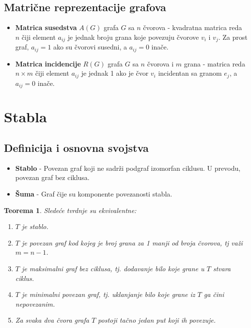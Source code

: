 \documentclass[a4paper,12pt,twoside]{report}
\newtheorem{theorem}{Teorema}[section]
\numberwithin{algorithm}{section}
\begin{document}
\subsection{Matrične reprezentacije grafova}
\begin{itemize}
    \item \textbf{Matrica susedstva} $A(G)$ grafa $G$ sa $n$ čvorova - kvadratna matrica reda $n$ čiji element $a_{ij}$ je jednak broju grana koje povezuju čvorove $v_i$ i $v_j$. Za prost graf, $a_{ij} = 1$ ako su čvorovi susedni, a $a_{ij} = 0$ inače.
    \item \textbf{Matrica incidencije} $R(G)$ grafa $G$ sa $n$ čvorova i $m$ grana - matrica reda $n \times m$ čiji element $a_{ij}$ je jednak 1 ako je čvor $v_i$ incidentan sa granom $e_j$, a $a_{ij} = 0$ inače.
\end{itemize}
\section{Stabla}
\subsection{Definicija i osnovna svojstva}
\begin{itemize}
    \item \textbf{Stablo} - Povezan graf koji ne sadrži podgraf izomorfan ciklusu. U prevodu, povezan graf bez ciklusa.
    \item \textbf{Šuma} - Graf čije su komponente povezanosti stabla.
\end{itemize}
\begin{theorem}
    Sledeće tvrdnje su ekvivalentne:
    \begin{enumerate}
        \item $T$ je stablo.
        \item $T$ je povezan graf kod kojeg je broj grana za 1 manji od broja čvorova, tj važi $m = n - 1$.
        \item $T$ je maksimalni graf bez ciklusa, tj. dodavanje bilo koje grane u $T$ stvara ciklus.
        \item $T$ je minimalni povezan graf, tj. uklanjanje bilo koje grane iz $T$ ga čini nepovezanim.
        \item Za svaka dva čvora grafa $T$ postoji tačno jedan put koji ih povezuje.
    \end{enumerate}
\end{theorem}
\end{document}
